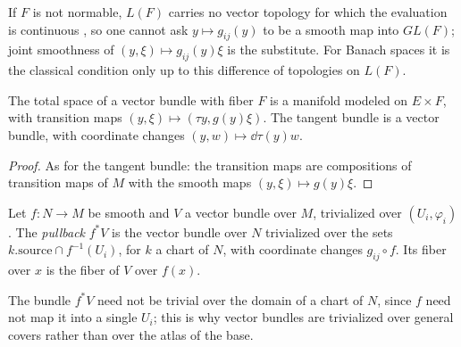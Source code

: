 If $F$ is not normable, $L(F)$ carries no vector topology for which the evaluation is continuous
\cite[Satz 1]{Mai63},
so one cannot ask $y \mapsto g_{ij}(y)$ to be a smooth map into $GL(F)$; joint smoothness of
$(y, \xi) \mapsto g_{ij}(y)\xi$ is the substitute. For Banach spaces it is the classical
condition only up to this difference of topologies on $L(F)$.

\begin{theorem}
  \label{thm:vector-bundle-manifold}
  \leanok
  The total space of a vector bundle with fiber $F$ is a manifold modeled on $E \times F$, with
  transition maps $(y, \xi) \mapsto (\tau y, g(y)\xi)$. The tangent bundle is a vector bundle,
  with coordinate changes $(y, w) \mapsto \dd\tau(y) w$.
\end{theorem}

\begin{proof}
  \leanok
  As for the tangent bundle: the transition maps are compositions of transition maps of $M$ with
  the smooth maps $(y, \xi) \mapsto g(y)\xi$.
\end{proof}

\begin{definition}
  \label{def:pullback-bundle}
  \leanok
  Let $f \colon N \to M$ be smooth and $V$ a vector bundle over $M$, trivialized over
  $(U_i, \varphi_i)$. The \emph{pullback} $f^*V$ is the vector bundle over $N$ trivialized over the
  sets $k.\mathrm{source} \cap f^{-1}(U_i)$, for $k$ a chart of $N$, with coordinate changes
  $g_{ij} \circ f$. Its fiber over $x$ is the fiber of $V$ over $f(x)$.
\end{definition}

The bundle $f^*V$ need not be trivial over the domain of a chart of $N$, since $f$ need not map
it into a single $U_i$; this is why vector bundles are trivialized over general covers rather
than over the atlas of the base.

